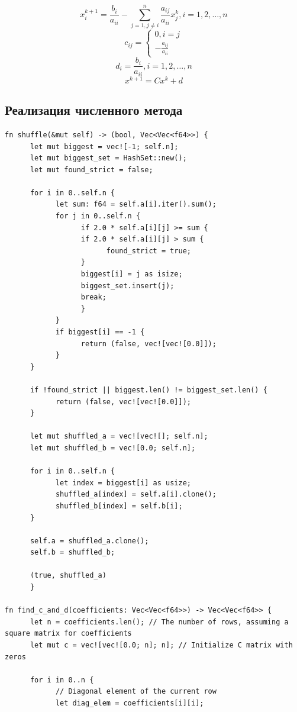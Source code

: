 \documentclass{article}
\begin{document}
      $$x_i^{k+1}=\frac{b_i}{a_{ii}}-\sum_{j=1, j \neq i}^n \frac{a_{ij}}{a_{ii}}x^k_j, i = 1,2,\dots,n$$
      $$c_{ij}=
      \begin{cases}
            0, i=j\\
            -\frac{a_{ij}}{a_{ii}}
      \end{cases}$$
      $$d_i=\frac{b_i}{a_{ii}}, i=1,2,\dots,n$$
      $$x^{k+1}=Cx^k+d$$

\subsection{Реализация численного метода}
\begin{lstlisting}
fn shuffle(&mut self) -> (bool, Vec<Vec<f64>>) {
      let mut biggest = vec![-1; self.n];
      let mut biggest_set = HashSet::new();
      let mut found_strict = false;

      for i in 0..self.n {
            let sum: f64 = self.a[i].iter().sum();
            for j in 0..self.n {
                  if 2.0 * self.a[i][j] >= sum {
                  if 2.0 * self.a[i][j] > sum {
                        found_strict = true;
                  }
                  biggest[i] = j as isize;
                  biggest_set.insert(j);
                  break;
                  }
            }
            if biggest[i] == -1 {
                  return (false, vec![vec![0.0]]);
            }
      }

      if !found_strict || biggest.len() != biggest_set.len() {
            return (false, vec![vec![0.0]]);
      }

      let mut shuffled_a = vec![vec![]; self.n];
      let mut shuffled_b = vec![0.0; self.n];

      for i in 0..self.n {
            let index = biggest[i] as usize;
            shuffled_a[index] = self.a[i].clone();
            shuffled_b[index] = self.b[i];
      }

      self.a = shuffled_a.clone();
      self.b = shuffled_b;

      (true, shuffled_a)
      }

fn find_c_and_d(coefficients: Vec<Vec<f64>>) -> Vec<Vec<f64>> {
      let n = coefficients.len(); // The number of rows, assuming a square matrix for coefficients
      let mut c = vec![vec![0.0; n]; n]; // Initialize C matrix with zeros

      for i in 0..n {
            // Diagonal element of the current row
            let diag_elem = coefficients[i][i];


\end{lstlisting}
\end{document}
